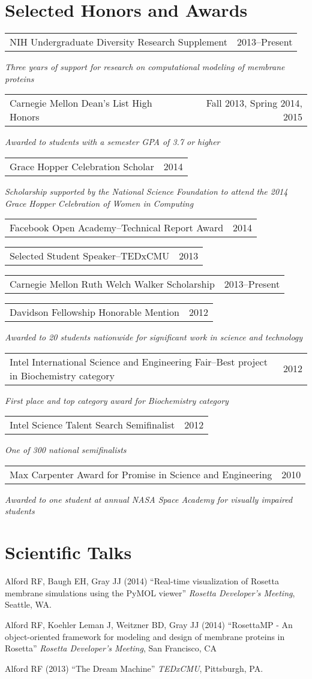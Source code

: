 \documentclass[12pt]{article}
\makeatletter
\newcommand{\allcapsspacing}[1]{{\addfontfeature{LetterSpace=7.5}#1}}
\newcommand{\leadershipitem}[3]{
\noindent
\begin{tabular*}{\textwidth}{@{\extracolsep{\fill}}lr}
		#1 & #2 \\
\end{tabular*}\newline\textit{#3}\vspace{0.75\baselineskip}\par}
\newcommand{\yearitem}[2]{
\noindent
\begin{tabular*}{\textwidth}{@{\extracolsep{\fill}}lr}
		#1 & #2 \\
\end{tabular*}\vspace{0.75\baselineskip}\par}
\makeatother
\begin{document}
\section*{\allcapsspacing{Selected Honors and Awards}}

\leadershipitem{NIH Undergraduate Diversity Research Supplement}{2013--Present}{Three years of support for research on computational modeling of membrane proteins}
\leadershipitem{Carnegie Mellon Dean's List High Honors}{Fall 2013, Spring 2014, 2015}{Awarded to students with a semester GPA of 3.7 or higher}
\leadershipitem{Grace Hopper Celebration Scholar}{2014}{Scholarship supported by the National Science Foundation to attend the 2014 Grace Hopper Celebration of Women in Computing}
\yearitem{Facebook Open Academy--Technical Report Award}{2014}
\yearitem{Selected Student Speaker--TEDxCMU}{2013}
\yearitem{Carnegie Mellon Ruth Welch Walker Scholarship}{2013--Present}
\leadershipitem{Davidson Fellowship Honorable Mention}{2012}{Awarded to 20 students nationwide for significant work in science and technology}
\leadershipitem{Intel International Science and Engineering Fair--Best project in Biochemistry category}{2012}{First place and top category award for Biochemistry category}
\leadershipitem{Intel Science Talent Search Semifinalist}{2012}{One of 300 national semifinalists}
\leadershipitem{Max Carpenter Award for Promise in Science and Engineering}{2010}{Awarded to one student at annual NASA Space Academy for visually impaired students}

\section*{\allcapsspacing{Scientific Talks}}

\begin{etaremune}
\item Alford RF, Baugh EH, Gray JJ (2014) ``Real-time visualization of Rosetta membrane simulations using the PyMOL viewer'' \textit{Rosetta Developer's Meeting}, Seattle, WA.
\item Alford RF, Koehler Leman J, Weitzner BD, Gray JJ (2014) ``RosettaMP - An object-oriented framework for modeling and design of membrane proteins in Rosetta'' \textit{Rosetta Developer's Meeting}, San Francisco, CA
\item Alford RF (2013) ``The Dream Machine'' \textit{TEDxCMU}, Pittsburgh, PA.
\end{etaremune}
\end{document}
